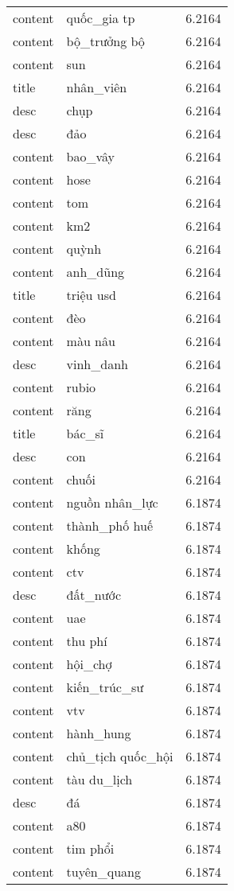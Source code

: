 \documentclass{article}
\begin{document}
\begin{tabular}{lll}
content & quốc\_gia tp & 6.2164\\
content & bộ\_trưởng bộ & 6.2164\\
content & sun & 6.2164\\
title & nhân\_viên & 6.2164\\
desc & chụp & 6.2164\\
desc & đảo & 6.2164\\
content & bao\_vây & 6.2164\\
content & hose & 6.2164\\
content & tom & 6.2164\\
content & km2 & 6.2164\\
content & quỳnh & 6.2164\\
content & anh\_dũng & 6.2164\\
title & triệu usd & 6.2164\\
content & đèo & 6.2164\\
content & màu nâu & 6.2164\\
desc & vinh\_danh & 6.2164\\
content & rubio & 6.2164\\
content & răng & 6.2164\\
title & bác\_sĩ & 6.2164\\
desc & con & 6.2164\\
content & chuối & 6.2164\\
content & nguồn nhân\_lực & 6.1874\\
content & thành\_phố huế & 6.1874\\
content & khống & 6.1874\\
content & ctv & 6.1874\\
desc & đất\_nước & 6.1874\\
content & uae & 6.1874\\
content & thu phí & 6.1874\\
content & hội\_chợ & 6.1874\\
content & kiến\_trúc\_sư & 6.1874\\
content & vtv & 6.1874\\
content & hành\_hung & 6.1874\\
content & chủ\_tịch quốc\_hội & 6.1874\\
content & tàu du\_lịch & 6.1874\\
desc & đá & 6.1874\\
content & a80 & 6.1874\\
content & tim phổi & 6.1874\\
content & tuyên\_quang & 6.1874\\

\end{tabular}
\end{document}
